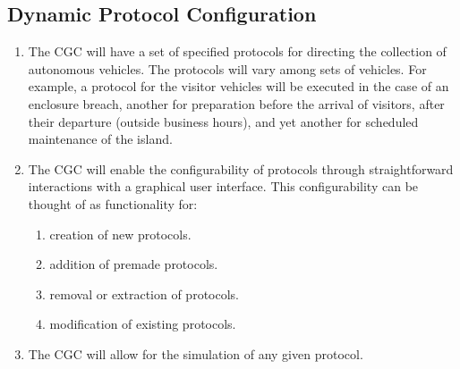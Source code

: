 \documentclass[12pt]{article}
\begin{document}
    \subsection{Dynamic Protocol Configuration}
    \begin{enumerate}
        \item The CGC will have a set of specified protocols for directing the collection 
        of autonomous vehicles. The protocols will vary among sets of vehicles. For example, 
        a protocol for the visitor vehicles will be executed in the case of an enclosure 
        breach, another for preparation before the arrival of visitors, after their departure 
        (outside business hours), and yet another for scheduled maintenance of the island.
        \item The CGC will enable the configurability of protocols through straightforward 
        interactions with a graphical user interface. This configurability can be thought of
        as functionality for:
        \begin{enumerate}
            \item creation of new protocols.
            \item addition of premade protocols.
            \item removal or extraction of protocols.
            \item modification of existing protocols.
        \end{enumerate}
        \item The CGC will allow for the simulation of any given protocol.
    \end{enumerate}
    
\end{document}
